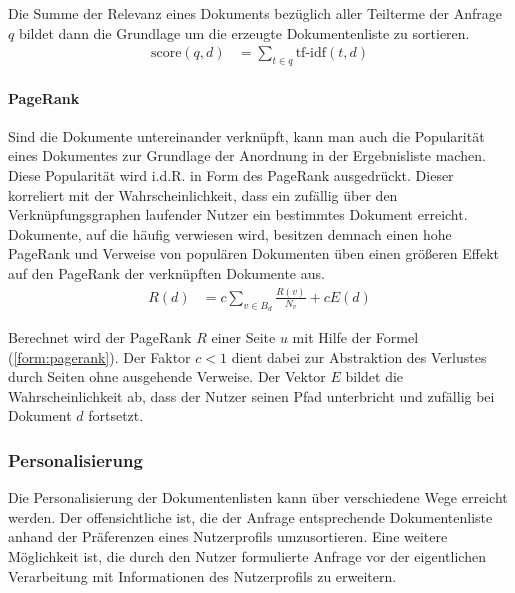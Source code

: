 Die Summe der Relevanz eines Dokuments bezüglich aller Teilterme der Anfrage $q$ bildet dann die Grundlage um die erzeugte Dokumentenliste zu sortieren.\citep{Manning2008} 
\begin{align}
\text{score}(q,d) & = \sum_{t \in q}{\text{tf-idf}(t,d)}  \label{form:docscore}
\end{align}

\paragraph{PageRank} Sind die Dokumente untereinander verknüpft, kann man auch die Popularität eines Dokumentes zur Grundlage der Anordnung in der Ergebnisliste machen. Diese Popularität wird i.d.R. in Form des PageRank ausgedrückt. Dieser korreliert mit der Wahrscheinlichkeit, dass ein zufällig über den Verknüpfungsgraphen laufender Nutzer ein bestimmtes Dokument erreicht. Dokumente, auf die häufig verwiesen wird, besitzen demnach einen hohe PageRank und Verweise von populären Dokumenten üben einen größeren Effekt auf den PageRank der verknüpften Dokumente aus.
\begin{align}
R(d) & = c \sum_{v \in B_d}{\frac{R(v)}{N_v}} + cE(d) \label{form:pagerank}
\end{align}

Berechnet wird der PageRank $R$ einer Seite $u$ mit Hilfe der Formel (\ref{form:pagerank}). Der Faktor $c < 1$ dient dabei zur Abstraktion des Verlustes durch Seiten ohne ausgehende Verweise. Der Vektor $E$ bildet die Wahrscheinlichkeit ab, dass der Nutzer seinen Pfad unterbricht und zufällig bei Dokument $d$ fortsetzt.\citep{pagerank,Manning2008}

\subsubsection{Personalisierung}\label{sec:personalresultstheorie}

Die Personalisierung der Dokumentenlisten kann über verschiedene Wege erreicht werden. Der offensichtliche ist, die der Anfrage entsprechende Dokumentenliste anhand der Präferenzen eines Nutzerprofils umzusortieren. Eine weitere Möglichkeit ist, die durch den Nutzer formulierte Anfrage vor der eigentlichen Verarbeitung mit Informationen des Nutzerprofils zu erweitern.

